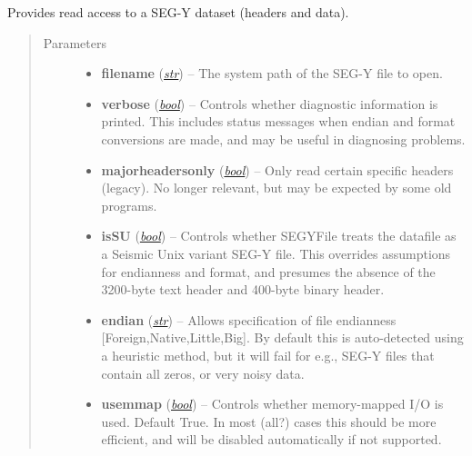 \documentclass[letterpaper,10pt,english]{sphinxmanual}
\begin{document}
\begin{fulllineitems}
\label{segyread:pygeo.segyread.SEGYFile}
Provides read access to a SEG-Y dataset (headers and data).
\begin{quote}\begin{description}
\item[{Parameters}] \leavevmode\begin{itemize}
\item {} 
\textbf{filename} (\href{http://docs.python.org/library/functions.html\#str}{\emph{str}}) -- The system path of the SEG-Y file to open.

\item {} 
\textbf{verbose} (\href{http://docs.python.org/library/functions.html\#bool}{\emph{bool}}) -- Controls whether diagnostic information is printed.  This includes status messages when endian and format conversions are made, and may be useful in diagnosing problems.

\item {} 
\textbf{majorheadersonly} (\href{http://docs.python.org/library/functions.html\#bool}{\emph{bool}}) -- Only read certain specific headers (legacy).  No longer relevant, but may be expected by some old programs.

\item {} 
\textbf{isSU} (\href{http://docs.python.org/library/functions.html\#bool}{\emph{bool}}) -- Controls whether SEGYFile treats the datafile as a Seismic Unix variant SEG-Y file.  This overrides assumptions for endianness and format, and presumes the absence of the 3200-byte text header and 400-byte binary header.

\item {} 
\textbf{endian} (\href{http://docs.python.org/library/functions.html\#str}{\emph{str}}) -- Allows specification of file endianness {[}Foreign,Native,Little,Big{]}.  By default this is auto-detected using a heuristic method, but it will fail for e.g., SEG-Y files that contain all zeros, or very noisy data.

\item {} 
\textbf{usemmap} (\href{http://docs.python.org/library/functions.html\#bool}{\emph{bool}}) -- Controls whether memory-mapped I/O is used. Default True.  In most (all?) cases this should be more efficient, and will be disabled automatically if not supported.

\end{itemize}


\end{description}
\end{quote}
\end{fulllineitems}
\end{document}
